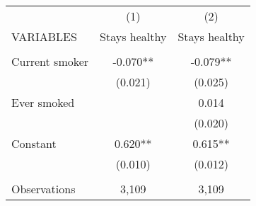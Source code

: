 \begin{tabular}{lcc} \hline
 & (1) & (2) \\
VARIABLES & Stays healthy & Stays healthy \\ \hline
 &  &  \\
Current smoker & -0.070** & -0.079** \\
 & (0.021) & (0.025) \\
Ever smoked &  & 0.014 \\
 &  & (0.020) \\
Constant & 0.620** & 0.615** \\
 & (0.010) & (0.012) \\
 &  &  \\
 Observations & 3,109 & 3,109 \\ \hline
\end{tabular}
